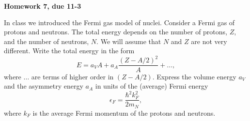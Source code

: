    
\pagestyle{plain}

\centerline{\bf\Large Homework 7, due 11-3}
\vspace*{0.5cm}

 In class we introduced the Fermi gas model of 
nuclei. Consider a Fermi gas of protons and
neutrons. The total energy depends on the 
number of protons, $Z$, and the number of
neutrons, $N$. We will assume that $N$ and
$Z$ are not very different. Write the total 
energy in the form 
\[
 E = a_V A + a_A\frac{(Z-A/2)^2}{A}+\ldots,
\]
where $\ldots$ are terms of higher order 
in $(Z-A/2)$. Express the volume energy 
$a_V$ and the asymmetry energy $a_A$ in 
units of the (average) Fermi energy 
\[
\epsilon_F=\frac{\hbar^2 k_F^2}{2m_N},
\]
where $k_F$ is the average Fermi momentum
of the protons and neutrons. 

   
 

 


  

